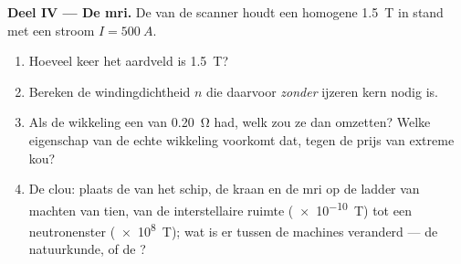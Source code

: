 \begin{problem}
\medskip
\noindent\textbf{Deel IV --- De mri.}
De  van de scanner houdt een homogene \qty{1.5}{T} in stand met
een stroom $I = \qty{500}{A}$.
\begin{enumerate}[resume]
  \item Hoeveel keer het aardveld is \qty{1.5}{T}?
  \item Bereken de windingdichtheid $n$ die daarvoor \emph{zonder}
        ijzeren kern nodig is.
  \item Als de wikkeling een  van \qty{0.20}{\ohm} had, welk
         zou ze dan omzetten? Welke eigenschap van de echte
        wikkeling voorkomt dat, tegen de prijs van extreme kou?
  \item De clou: plaats de  van het schip, de kraan en de mri op de
        ladder van machten van tien, van de interstellaire ruimte
        (\qty{e-10}{T}) tot een neutronenster (\qty{e8}{T}); wat is er
        tussen de machines veranderd --- de natuurkunde, of de ?
\end{enumerate}
\end{problem}
